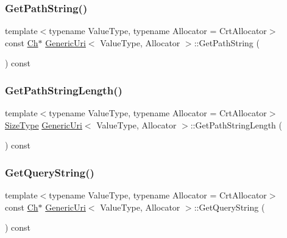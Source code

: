 \mbox{\label{classGenericUri_ac49bd4ca9eb8ea2533dfb97f2318d8c4}} 
\subsubsection{\texorpdfstring{Get\+Path\+String()}{GetPathString()}}
{\footnotesize\ttfamily template$<$typename Value\+Type, typename Allocator = Crt\+Allocator$>$ \\
const \hyperlink{classGenericUri_a20d0602cff62211d89bc4b25963beeee}{Ch}$\ast$ \hyperlink{classGenericUri}{Generic\+Uri}$<$ Value\+Type, Allocator $>$\+::Get\+Path\+String (\begin{DoxyParamCaption}{ }\end{DoxyParamCaption}) const\hspace{0.3cm}{\ttfamily [inline]}}

\mbox{\label{classGenericUri_a7d6e5a13cb64cb5b65439bfd9ea82674}} 
\subsubsection{\texorpdfstring{Get\+Path\+String\+Length()}{GetPathStringLength()}}
{\footnotesize\ttfamily template$<$typename Value\+Type, typename Allocator = Crt\+Allocator$>$ \\
\hyperlink{rapidjson_8h_a5ed6e6e67250fadbd041127e6386dcb5}{Size\+Type} \hyperlink{classGenericUri}{Generic\+Uri}$<$ Value\+Type, Allocator $>$\+::Get\+Path\+String\+Length (\begin{DoxyParamCaption}{ }\end{DoxyParamCaption}) const\hspace{0.3cm}{\ttfamily [inline]}}

\mbox{\label{classGenericUri_a305864abbde795e2864ae01f5c299071}} 
\subsubsection{\texorpdfstring{Get\+Query\+String()}{GetQueryString()}}
{\footnotesize\ttfamily template$<$typename Value\+Type, typename Allocator = Crt\+Allocator$>$ \\
const \hyperlink{classGenericUri_a20d0602cff62211d89bc4b25963beeee}{Ch}$\ast$ \hyperlink{classGenericUri}{Generic\+Uri}$<$ Value\+Type, Allocator $>$\+::Get\+Query\+String (\begin{DoxyParamCaption}{ }\end{DoxyParamCaption}) const\hspace{0.3cm}{\ttfamily [inline]}}

